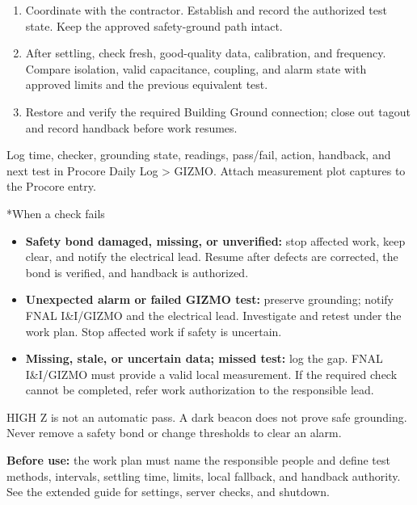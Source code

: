 \documentclass[10pt]{article}
\makeatletter
\renewcommand\section{\@startsection{section}{1}{\z@}{1.2ex plus .2ex}{.6ex}{\normalfont\large\bfseries}}
\makeatother
\begin{document}
\begin{enumerate}
\item Coordinate with the contractor. Establish and record the authorized test state. Keep the approved safety-ground path intact.
\item After settling, check fresh, good-quality data, calibration, and frequency. Compare isolation, valid capacitance, coupling, and alarm state with approved limits and the previous equivalent test.
\item Restore and verify the required Building Ground connection; close out tagout and record handback before work resumes.
\end{enumerate}
Log time, checker, grounding state, readings, pass/fail, action, handback, and next test in Procore Daily Log \textgreater{} GIZMO. Attach measurement plot captures to the Procore entry.

\section*{When a check fails}
\begin{itemize}
\item \textbf{Safety bond damaged, missing, or unverified:} stop affected work, keep clear, and notify the electrical lead. Resume after defects are corrected, the bond is verified, and handback is authorized.
\item \textbf{Unexpected alarm or failed GIZMO test:} preserve grounding; notify FNAL I\&I/GIZMO and the electrical lead. Investigate and retest under the work plan. Stop affected work if safety is uncertain.
\item \textbf{Missing, stale, or uncertain data; missed test:} log the gap. FNAL I\&I/GIZMO must provide a valid local measurement. If the required check cannot be completed, refer work authorization to the responsible lead.
\end{itemize}
HIGH Z is not an automatic pass. A dark beacon does not prove safe grounding. Never remove a safety bond or change thresholds to clear an alarm.

\textbf{Before use:} the work plan must name the responsible people and define test methods, intervals, settling time, limits, local fallback, and handback authority. See the extended guide for settings, server checks, and shutdown.
\end{document}
